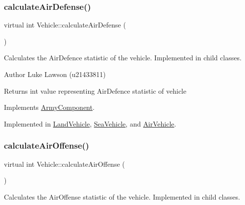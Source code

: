\subsubsection{\texorpdfstring{calculateAirDefense()}{calculateAirDefense()}}
{\footnotesize\ttfamily virtual int Vehicle\+::calculate\+Air\+Defense (\begin{DoxyParamCaption}{ }\end{DoxyParamCaption})\hspace{0.3cm}{\ttfamily [pure virtual]}}



Calculates the Air\+Defence statistic of the vehicle. Implemented in child classes. 

\begin{DoxyAuthor}{Author}
Luke Lawson (u21433811) 
\end{DoxyAuthor}
\begin{DoxyReturn}{Returns}
int value representing Air\+Defence statistic of vehicle 
\end{DoxyReturn}


Implements \mbox{\hyperlink{class_army_component_a9f6671dd8cd4037722f592f0fa86e3a2}{Army\+Component}}.



Implemented in \mbox{\hyperlink{class_land_vehicle_af5083b44d73c3597be9ab081d06bc7a6}{Land\+Vehicle}}, \mbox{\hyperlink{class_sea_vehicle_a694afec180b77cee3adf29674e0c3160}{Sea\+Vehicle}}, and \mbox{\hyperlink{class_air_vehicle_ade9dabaec365370683599f3df95189c2}{Air\+Vehicle}}.

\mbox{\label{class_vehicle_a0a6c6ed9d25c66415f83191894b11499}} 
\subsubsection{\texorpdfstring{calculateAirOffense()}{calculateAirOffense()}}
{\footnotesize\ttfamily virtual int Vehicle\+::calculate\+Air\+Offense (\begin{DoxyParamCaption}{ }\end{DoxyParamCaption})\hspace{0.3cm}{\ttfamily [pure virtual]}}



Calculates the Air\+Offense statistic of the vehicle. Implemented in child classes. 

